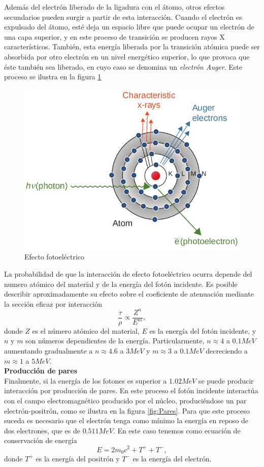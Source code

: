 Además del electrón liberado de la ligadura con el átomo, otros efectos secundarios pueden surgir a partir de esta interacción. Cuando el electrón es expulsado del átomo, esté deja un espacio libre que puede ocupar un electrón de una capa superior, y en este proceso de transición se producen rayos X característicos. También, esta energía liberada por la transición atómica puede ser absorbida por otro electrón en un nivel energético superior, lo que provoca que éste también sea liberado, en cuyo caso se denomina un \textit{electrón Auger}. Este proceso se ilustra en la figura \ref{fig:fotoelectrico}\\
\begin{figure}[H]
	\centering
	\includegraphics[width=0.7\linewidth]{images/fotoelectrico.png}
	\caption{Efecto fotoeléctrico \cite{khan2014the}}
	\label{fig:fotoelectrico}
\end{figure}

La probabilidad de que la interacción de efecto fotoeléctrico ocurra depende del numero atómico del material y de la energía del fotón incidente. Es posible describir aproximadamente su efecto sobre el coeficiente de atenuación mediante la sección eficaz por interacción
\begin{equation}
	\frac{\tau}{\rho}\propto \frac{Z^n}{E^m},
\end{equation} 
donde $Z$ es el número atómico del material, $E$ es la energía del fotón incidente, y $n$ y $m$ son números dependientes de la energía. Particularmente, $n\approx 4$ a $0.1 MeV$ aumentando gradualmente a $n\approx4.6$ a $3 MeV$ y $m\approx3$ a $0.1 MeV$ decreciendo a $m\approx1$ a $5 MeV$.\\

\textbf{Producción de pares}\\

Finalmente, si la energía de los fotones es superior a $1.02 MeV$ se puede producir interacción por producción de pares. En este proceso el fotón incidente interactúa con el campo electromagnético producido por el núcleo, produciéndose un par electrón-positrón, como se ilustra en la figura \ref{fig:Pares}. Para que este proceso suceda es necesario que el electrón tenga como mínimo la energía en reposo de dos electrones, que es de $0.511 MeV$. En este caso tenemos como ecuación de conservación de energía
\begin{equation}
	E=2m_0c^2+T^{+}+T^{-},
\end{equation}
donde $T^{+}$ es la energía del positrón y $T^{-}$ es la energía del electrón.\\

